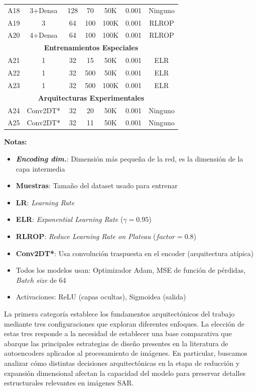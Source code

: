 \begin{table}[htbp]
\begin{tabular}{|c|c|c|c|c|c|c|}
A18 & 3+Densa & 128 & 70 & 50K & 0.001 & Ninguno \\
A19 & 3 & 64 & 100 & 100K & 0.001 & RLROP \\
A20 & 4+Densa & 64 & 100 & 100K & 0.001 & RLROP \\
\hline
\hline
\multicolumn{7}{|c|}{\textbf{Entrenamientos Especiales}} \\
\hline
A21 & 1 & 32 & 15 & 50K & 0.001 & ELR \\
A22 & 1 & 32 & 500 & 50K & 0.001 & ELR \\
A23 & 1 & 32 & 500 & 100K & 0.001 & ELR \\
\hline
\hline
\multicolumn{7}{|c|}{\textbf{Arquitecturas Experimentales}} \\
\hline
A24 & Conv2DT* & 32 & 20 & 50K & 0.001 & Ninguno \\
A25 & Conv2DT* & 32 & 11 & 50K & 0.001 & Ninguno \\
\hline
\end{tabular}

\begin{flushleft}
\footnotesize
\textbf{Notas:}
\begin{itemize}
    \item \textbf{\emph{Encoding dim.}}: Dimensión más pequeña de la red, es la dimensión de la capa intermedia
    \item \textbf{Muestras}: Tamaño del dataset usado para entrenar
    \item \textbf{LR}: \emph{Learning Rate}
    \item \textbf{ELR}: \emph{Exponential Learning Rate} ($\gamma=0.95$)
    \item \textbf{RLROP}: \emph{Reduce Learning Rate on Plateau} ($factor=0.8$)
    \item \textbf{Conv2DT*}: Usa convolución traspuesta en el encoder (arquitectura atípica)
    \item Todos los modelos usan: Optimizador Adam, MSE de función de pérdidas, \emph{Batch size} de 64
    \item Activaciones: ReLU (capas ocultas), Sigmoidea (salida)
\end{itemize}
\end{flushleft}
\end{table}


La primera categoría establece los fundamentos arquitectónicos del trabajo mediante tres configuraciones que exploran diferentes enfoques. La elección de estas tres responde a la necesidad de establecer una base comparativa que abarque las principales estrategias de diseño presentes en la literatura de autoencoders aplicados al procesamiento de imágenes. En particular, buscamos analizar cómo distintas decisiones arquitectónicas en la etapa de reducción y expansión dimensional afectan la capacidad del modelo para preservar detalles estructurales relevantes en imágenes SAR.

